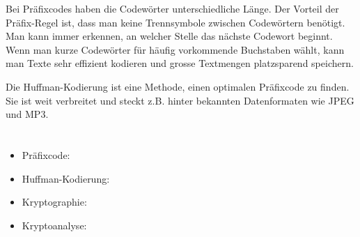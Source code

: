 {{Bei Präfixcodes haben die Codewörter unterschiedliche Länge. Der Vorteil der Präfix-Regel ist, dass man keine Trennsymbole zwischen Codewörtern benötigt. Man kann immer erkennen, an welcher Stelle das nächste Codewort beginnt. Wenn man kurze Codewörter für häufig vorkommende Buchstaben wählt, kann man Texte sehr effizient kodieren und grosse Textmengen platzsparend speichern.

Die Huffman-Kodierung ist eine Methode, einen optimalen Präfixcode zu finden. Sie ist weit verbreitet und steckt z.B. hinter bekannten Datenformaten wie JPEG und MP3.



\section*{\BrochureWebsitesAndKeywords}
{\raggedright
\begin{itemize}
  \item Präfixcode: \href{https://de.wikipedia.org/wiki/Pr\%C3\%A4fixcode}{}
  \item Huffman-Kodierung: \href{https://de.wikipedia.org/wiki/Huffman-Kodierung}{}
  \item Kryptographie: \href{https://de.wikipedia.org/wiki/Kryptographie}{}
  \item Kryptoanalyse: \href{https://de.wikipedia.org/wiki/Kryptoanalyse}{}
\end{itemize}


}

}{}

\def\AuthorPozdniakovS{} %
\def\AuthorPosovI{} %
\def\AuthorPrettiJ{} %
\def\AuthorMalchiodiD{} %
\def\AuthorWeigendM{} %
\def\AuthorPohlW{} %
\def\AuthorDatzkoC{} %

\newpage}{}
